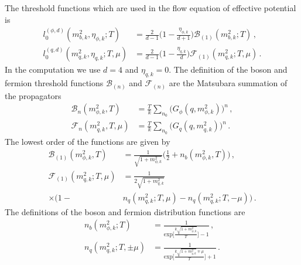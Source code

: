 \documentclass[aps,twocolumn,prd,superscriptaddress,nofootinbib,floatfix]{revtex4-2}
\begin{document}
The threshold functions which are used in the flow equation of effective potential is
%
\begin{align}
l_0^{(\phi,d)}(m^2_{b,k},\eta_{\phi,k};T)&=\frac{2}{d-1}\bigg(1-\frac{\eta_{\phi,k}}{d+1}\bigg)\mathcal{B}_{(1)}(m^2_{b,k};T)\,,\\[2ex]
l_0^{(q,d)}(m^2_{q,k},\eta_{q,k};T,\mu)&=\frac{2}{d-1}\bigg(1-\frac{\eta_{q,k}}{d}\bigg)\mathcal{F}_{(1)}(m^2_{q,k};T,\mu)\,.
\end{align}
%
In the computation we use $d=4$ and $\eta_{q,k}=0$. The definition of the boson and fermion threshold functions $\mathcal{B}_{(n)}$ and $\mathcal{F}_{(n)}$ are the Matsubara summation of the propagators
%
\begin{align}
\mathcal{B}_{n}(m^2_{\phi,k},T)&=\frac{T}{k}\sum_{n_0}\Big(G_\phi(q,m^2_{\phi,k})\Big)^n\,,\\[2ex]
\mathcal{F}_{n}(m^2_{q,k},T,\mu)&=\frac{T}{k}\sum_{n_0}\Big(G_q(q,m^2_{q,k})\Big)^n\,.
\end{align}
%
The lowest order of the functions are given by
%
\begin{align}
\mathcal{B}_{(1)}(m^2_{\phi,k},T)&=\frac{1}{\sqrt{1+m^2_{\phi,k}}}\bigg(\frac{1}{2}+n_b(m^2_{\phi,k},T)\bigg)\,,\\[2ex]
\mathcal{F}_{(1)}(m^2_{q,k};T,\mu)&=\frac{1}{2\sqrt{1+m^2_{q,k}}}\\
\times\bigg(1-&n_q(m^2_{q,k};T,\mu)-n_q(m^2_{q,k};T,-\mu)\bigg)\,.
\end{align}
%
The definitions of the boson and fermion distribution functions are
%
\begin{align}
n_b(m^2_{\phi,k};T)&=\frac{1}{\mathrm{exp}\Big[\frac{k\sqrt{1+m^2_{\phi,k}}}{T}\Big]-1}\,,\\[2ex]
n_q(m^2_{q,k};T,\pm\mu)&=\frac{1}{\mathrm{exp}\Big[\frac{k\sqrt{1+m^2_{q,k}}\mp\mu}{T}\Big]+1}\,.
\end{align}
%
\end{document}

